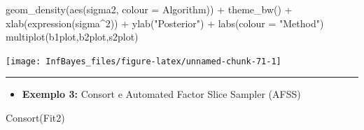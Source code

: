\documentclass[
]{book}
\newenvironment{Shaded}{\begin{snugshade}}{\end{snugshade}}
\newcommand{\AttributeTok}[1]{\textcolor[rgb]{0.77,0.63,0.00}{#1}}
\newcommand{\DecValTok}[1]{\textcolor[rgb]{0.00,0.00,0.81}{#1}}
\newcommand{\FunctionTok}[1]{\textcolor[rgb]{0.00,0.00,0.00}{#1}}
\newcommand{\NormalTok}[1]{#1}
\newcommand{\SpecialCharTok}[1]{\textcolor[rgb]{0.00,0.00,0.00}{#1}}
\newcommand{\StringTok}[1]{\textcolor[rgb]{0.31,0.60,0.02}{#1}}
\providecommand{\tightlist}{%
  \setlength{\itemsep}{0pt}\setlength{\parskip}{0pt}}
\begin{document}
\begin{Shaded}
\begin{Highlighting}[]
  \FunctionTok{geom\_density}\NormalTok{(}\FunctionTok{aes}\NormalTok{(sigma2, }\AttributeTok{colour =}\NormalTok{ Algorithm)) }\SpecialCharTok{+} \FunctionTok{theme\_bw}\NormalTok{() }\SpecialCharTok{+}
  \FunctionTok{xlab}\NormalTok{(}\FunctionTok{expression}\NormalTok{(sigma}\SpecialCharTok{\^{}}\DecValTok{2}\NormalTok{)) }\SpecialCharTok{+} \FunctionTok{ylab}\NormalTok{(}\StringTok{"Posterior"}\NormalTok{) }\SpecialCharTok{+} \FunctionTok{labs}\NormalTok{(}\AttributeTok{colour =} \StringTok{"Method"}\NormalTok{)}
\FunctionTok{multiplot}\NormalTok{(b1plot,b2plot,s2plot)}
\end{Highlighting}
\end{Shaded}

\begin{center}\texttt{[image: InfBayes\_files/figure-latex/unnamed-chunk-71-1]} \end{center}

\begin{center}\rule{0.5\linewidth}{0.5pt}\end{center}

\begin{itemize}
\tightlist
\item
  \textbf{Exemplo 3:} Consort e Automated Factor Slice Sampler (AFSS)
\end{itemize}

\begin{Shaded}
\begin{Highlighting}[]
\FunctionTok{Consort}\NormalTok{(Fit2)}
\end{Highlighting}
\end{Shaded}
\end{document}

